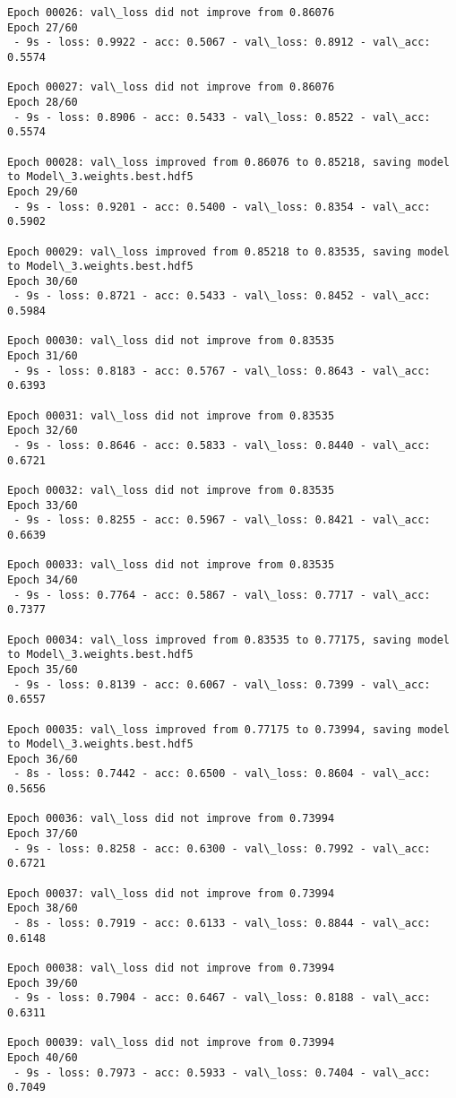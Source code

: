 \documentclass[11pt]{article}
\begin{document}
\begin{Verbatim}[commandchars=\\\{\}]
Epoch 00026: val\_loss did not improve from 0.86076
Epoch 27/60
 - 9s - loss: 0.9922 - acc: 0.5067 - val\_loss: 0.8912 - val\_acc: 0.5574

Epoch 00027: val\_loss did not improve from 0.86076
Epoch 28/60
 - 9s - loss: 0.8906 - acc: 0.5433 - val\_loss: 0.8522 - val\_acc: 0.5574

Epoch 00028: val\_loss improved from 0.86076 to 0.85218, saving model to Model\_3.weights.best.hdf5
Epoch 29/60
 - 9s - loss: 0.9201 - acc: 0.5400 - val\_loss: 0.8354 - val\_acc: 0.5902

Epoch 00029: val\_loss improved from 0.85218 to 0.83535, saving model to Model\_3.weights.best.hdf5
Epoch 30/60
 - 9s - loss: 0.8721 - acc: 0.5433 - val\_loss: 0.8452 - val\_acc: 0.5984

Epoch 00030: val\_loss did not improve from 0.83535
Epoch 31/60
 - 9s - loss: 0.8183 - acc: 0.5767 - val\_loss: 0.8643 - val\_acc: 0.6393

Epoch 00031: val\_loss did not improve from 0.83535
Epoch 32/60
 - 9s - loss: 0.8646 - acc: 0.5833 - val\_loss: 0.8440 - val\_acc: 0.6721

Epoch 00032: val\_loss did not improve from 0.83535
Epoch 33/60
 - 9s - loss: 0.8255 - acc: 0.5967 - val\_loss: 0.8421 - val\_acc: 0.6639

Epoch 00033: val\_loss did not improve from 0.83535
Epoch 34/60
 - 9s - loss: 0.7764 - acc: 0.5867 - val\_loss: 0.7717 - val\_acc: 0.7377

Epoch 00034: val\_loss improved from 0.83535 to 0.77175, saving model to Model\_3.weights.best.hdf5
Epoch 35/60
 - 9s - loss: 0.8139 - acc: 0.6067 - val\_loss: 0.7399 - val\_acc: 0.6557

Epoch 00035: val\_loss improved from 0.77175 to 0.73994, saving model to Model\_3.weights.best.hdf5
Epoch 36/60
 - 8s - loss: 0.7442 - acc: 0.6500 - val\_loss: 0.8604 - val\_acc: 0.5656

Epoch 00036: val\_loss did not improve from 0.73994
Epoch 37/60
 - 9s - loss: 0.8258 - acc: 0.6300 - val\_loss: 0.7992 - val\_acc: 0.6721

Epoch 00037: val\_loss did not improve from 0.73994
Epoch 38/60
 - 8s - loss: 0.7919 - acc: 0.6133 - val\_loss: 0.8844 - val\_acc: 0.6148

Epoch 00038: val\_loss did not improve from 0.73994
Epoch 39/60
 - 9s - loss: 0.7904 - acc: 0.6467 - val\_loss: 0.8188 - val\_acc: 0.6311

Epoch 00039: val\_loss did not improve from 0.73994
Epoch 40/60
 - 9s - loss: 0.7973 - acc: 0.5933 - val\_loss: 0.7404 - val\_acc: 0.7049


\end{Verbatim}
\end{document}

